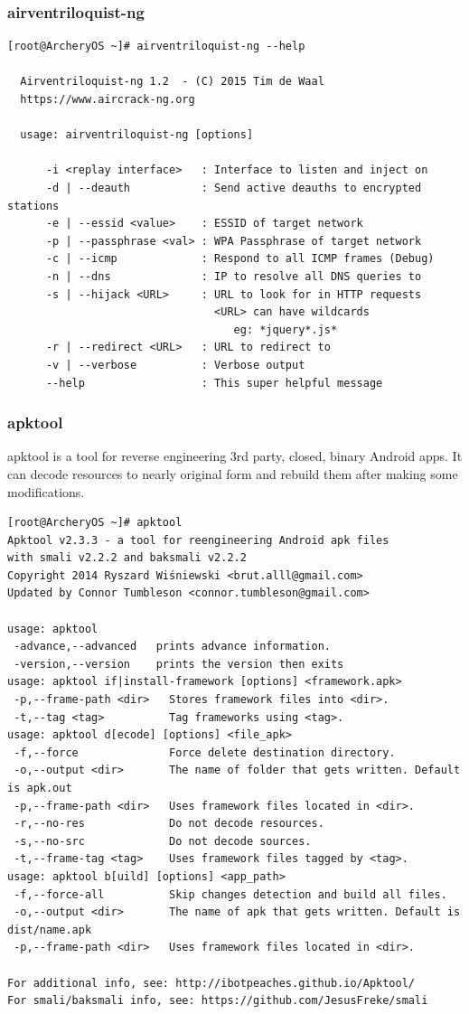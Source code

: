 \documentclass{article}
\begin{document}
\subsubsection{airventriloquist-ng}
\begin{lstlisting}
[root@ArcheryOS ~]# airventriloquist-ng --help

  Airventriloquist-ng 1.2  - (C) 2015 Tim de Waal
  https://www.aircrack-ng.org

  usage: airventriloquist-ng [options]

      -i <replay interface>   : Interface to listen and inject on
      -d | --deauth           : Send active deauths to encrypted stations
      -e | --essid <value>    : ESSID of target network 
      -p | --passphrase <val> : WPA Passphrase of target network
      -c | --icmp             : Respond to all ICMP frames (Debug)
      -n | --dns              : IP to resolve all DNS queries to
      -s | --hijack <URL>     : URL to look for in HTTP requests
                                <URL> can have wildcards
                                   eg: *jquery*.js*
      -r | --redirect <URL>   : URL to redirect to
      -v | --verbose          : Verbose output
      --help                  : This super helpful message
\end{lstlisting}

\subsubsection{apktool}
apktool is a tool for reverse engineering 3rd party, closed, binary Android apps. It can decode resources to nearly original form and rebuild them after making some modifications.
\begin{lstlisting}
[root@ArcheryOS ~]# apktool
Apktool v2.3.3 - a tool for reengineering Android apk files
with smali v2.2.2 and baksmali v2.2.2
Copyright 2014 Ryszard Wiśniewski <brut.alll@gmail.com>
Updated by Connor Tumbleson <connor.tumbleson@gmail.com>

usage: apktool
 -advance,--advanced   prints advance information.
 -version,--version    prints the version then exits
usage: apktool if|install-framework [options] <framework.apk>
 -p,--frame-path <dir>   Stores framework files into <dir>.
 -t,--tag <tag>          Tag frameworks using <tag>.
usage: apktool d[ecode] [options] <file_apk>
 -f,--force              Force delete destination directory.
 -o,--output <dir>       The name of folder that gets written. Default is apk.out
 -p,--frame-path <dir>   Uses framework files located in <dir>.
 -r,--no-res             Do not decode resources.
 -s,--no-src             Do not decode sources.
 -t,--frame-tag <tag>    Uses framework files tagged by <tag>.
usage: apktool b[uild] [options] <app_path>
 -f,--force-all          Skip changes detection and build all files.
 -o,--output <dir>       The name of apk that gets written. Default is dist/name.apk
 -p,--frame-path <dir>   Uses framework files located in <dir>.

For additional info, see: http://ibotpeaches.github.io/Apktool/
For smali/baksmali info, see: https://github.com/JesusFreke/smali
\end{lstlisting}
\end{document}
